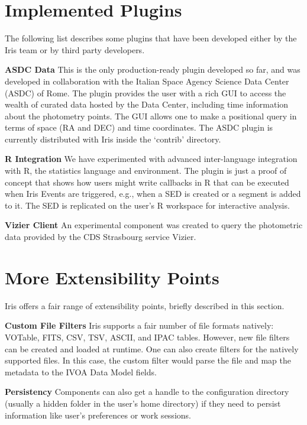 \section{Implemented Plugins}
The following list describes some plugins that have been developed either by the Iris team or by third party developers.

\textbf{ASDC Data}
This is the only production-ready plugin developed so far, and was developed in collaboration with the Italian Space Agency Science Data Center (ASDC) of Rome. The plugin provides the user with a rich GUI to access the wealth of curated data hosted by the Data Center, including time information about the photometry points. The GUI allows one to make a positional query in terms of space (RA and DEC) and time coordinates. The ASDC plugin is currently distributed with Iris inside the `contrib' directory.

\textbf{R Integration}
We have experimented with advanced inter-language integration with R, the statistics language and environment. The plugin is just a proof of concept that shows how users might write callbacks in R that can be executed when Iris Events are triggered, e.g., when a SED is created or a segment is added to it. The SED is replicated on the user's R workspace for interactive analysis.

\textbf{Vizier Client}
An experimental component was created to query the photometric data provided by the CDS Strasbourg service Vizier.

\section{More Extensibility Points}
Iris offers a fair range of extensibility points, briefly described in this section.

\textbf{Custom File Filters}
Iris supports a fair number of file formats natively: VOTable, FITS, CSV, TSV, ASCII, and IPAC tables. However, new file filters can be created and loaded at runtime. One can also create filters for the natively supported files. In this case, the custom filter would parse the file and map the metadata to the IVOA Data Model fields.

\textbf{Persistency}
Components can also get a handle to the configuration directory (usually a hidden folder in the user's home directory) if they need to persist information like user's preferences or work sessions.

